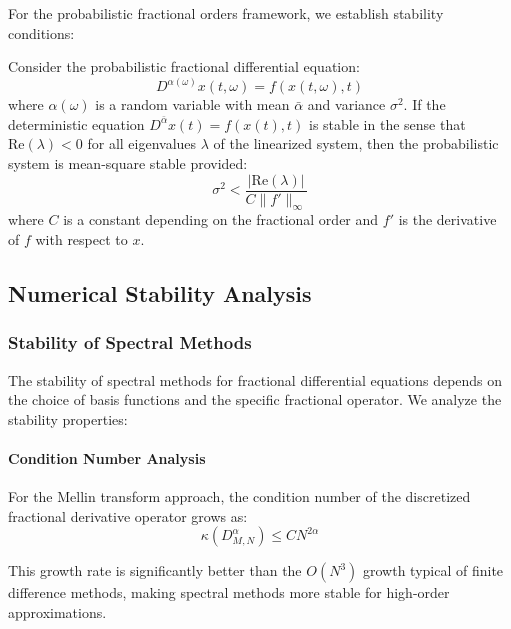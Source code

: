 For the probabilistic fractional orders framework, we establish stability conditions:

\begin{theorem}
Consider the probabilistic fractional differential equation:
\begin{equation}
D^{\alpha(\omega)} x(t,\omega) = f(x(t,\omega), t)
\end{equation}
where $\alpha(\omega)$ is a random variable with mean $\bar{\alpha}$ and variance $\sigma^2$. If the deterministic equation $D^{\bar{\alpha}} x(t) = f(x(t), t)$ is stable in the sense that $\text{Re}(\lambda) < 0$ for all eigenvalues $\lambda$ of the linearized system, then the probabilistic system is mean-square stable provided:
\begin{equation}
\sigma^2 < \frac{|\text{Re}(\lambda)|}{C \|f'\|_{\infty}}
\end{equation}
where $C$ is a constant depending on the fractional order and $f'$ is the derivative of $f$ with respect to $x$.
\end{theorem}

\subsection{Numerical Stability Analysis}

\subsubsection{Stability of Spectral Methods}

The stability of spectral methods for fractional differential equations depends on the choice of basis functions and the specific fractional operator. We analyze the stability properties:

\paragraph{Condition Number Analysis}

For the Mellin transform approach, the condition number of the discretized fractional derivative operator grows as:
\begin{equation}
\kappa(D^{\alpha}_{M,N}) \leq C N^{2\alpha}
\end{equation}

This growth rate is significantly better than the $O(N^3)$ growth typical of finite difference methods, making spectral methods more stable for high-order approximations.

